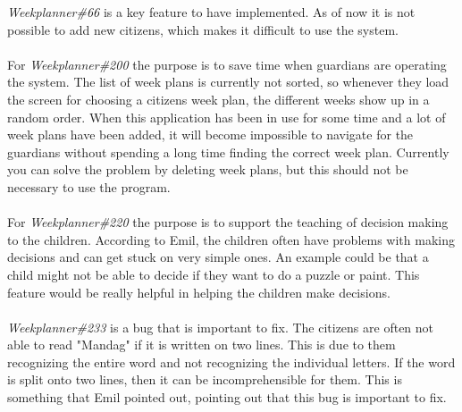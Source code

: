\noindent
\textit{Weekplanner\#66} is a key feature to have implemented. 
As of now it is not possible to add new citizens, which makes it difficult to use the system. 
\\\\
For \textit{Weekplanner\#200} the purpose is to save time when guardians are operating the system. 
The list of week plans is currently not sorted, so whenever they load the screen for choosing a citizens week plan, the different weeks show up in a random order. 
When this application has been in use for some time and a lot of week plans have been added, it will become impossible to navigate for the guardians without spending a long time finding the correct week plan.
Currently you can solve the problem by deleting week plans, but this should not be necessary to use the program.
\\\\
For \textit{Weekplanner\#220} the purpose is to support the teaching of decision making to the children.
According to Emil, the children often have problems with making decisions and can get stuck on very simple ones. 
An example could be that a child might not be able to decide if they want to do a puzzle or paint.
This feature would be really helpful in helping the children make decisions.
\\\\
\textit{Weekplanner\#233} is a bug that is important to fix.
The citizens are often not able to read "Mandag" if it is written on two lines. 
This is due to them recognizing the entire word and not recognizing the individual letters. 
If the word is split onto two lines, then it can be incomprehensible for them.
This is something that Emil pointed out, pointing out that this bug is important to fix.

